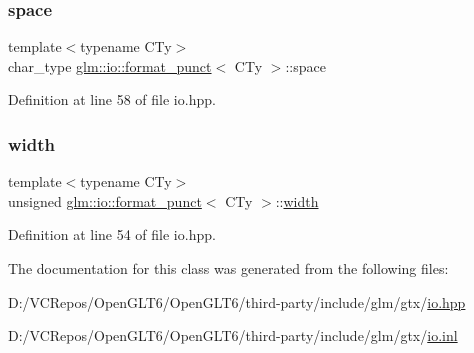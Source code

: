\mbox{\label{classglm_1_1io_1_1format__punct_adf9a915938727793de1daca07dcdfa4e}} 
\subsubsection{\texorpdfstring{space}{space}}
{\footnotesize\ttfamily template$<$typename C\+Ty$>$ \\
char\+\_\+type \mbox{\hyperlink{classglm_1_1io_1_1format__punct}{glm\+::io\+::format\+\_\+punct}}$<$ C\+Ty $>$\+::space}



Definition at line 58 of file io.\+hpp.

\mbox{\label{classglm_1_1io_1_1format__punct_a95d32ca2330bbf7c50d3e066b7a851db}} 
\subsubsection{\texorpdfstring{width}{width}}
{\footnotesize\ttfamily template$<$typename C\+Ty$>$ \\
unsigned \mbox{\hyperlink{classglm_1_1io_1_1format__punct}{glm\+::io\+::format\+\_\+punct}}$<$ C\+Ty $>$\+::\mbox{\hyperlink{structglm_1_1io_1_1width}{width}}}



Definition at line 54 of file io.\+hpp.



The documentation for this class was generated from the following files\+:\begin{DoxyCompactItemize}
\item 
D\+:/\+V\+C\+Repos/\+Open\+G\+L\+T6/\+Open\+G\+L\+T6/third-\/party/include/glm/gtx/\mbox{\hyperlink{io_8hpp}{io.\+hpp}}\item 
D\+:/\+V\+C\+Repos/\+Open\+G\+L\+T6/\+Open\+G\+L\+T6/third-\/party/include/glm/gtx/\mbox{\hyperlink{io_8inl}{io.\+inl}}\end{DoxyCompactItemize}
